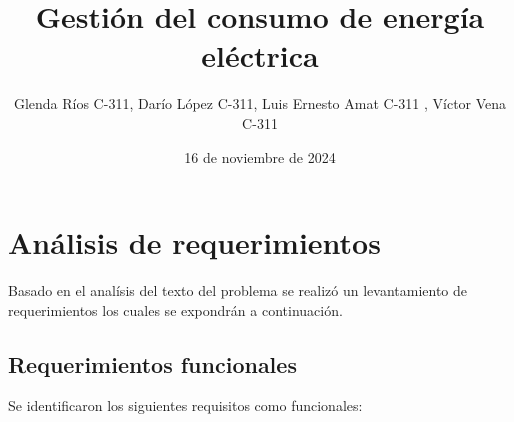 \documentclass{article}
\title{Gestión del consumo de energía eléctrica}
\author{Glenda Ríos C-311, Darío López C-311,  Luis Ernesto Amat C-311 , Víctor Vena C-311}
\date{16 de noviembre de 2024}
\begin{document}
\maketitle

\section{Análisis de requerimientos}
Basado en el analísis del texto del problema se realizó un levantamiento de requerimientos  los cuales se expondrán a continuación.

\subsection{Requerimientos funcionales}

Se identificaron los siguientes requisitos como funcionales:
\end{document}
